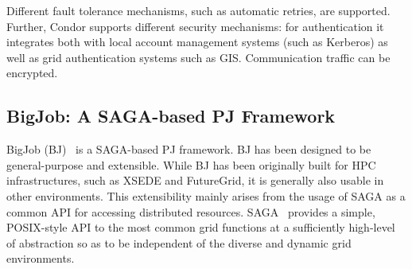 \documentclass{sig-alternate}
\begin{document}
Different fault tolerance mechanisms, such as automatic retries, are
supported.  Further, Condor supports different security mechanisms:
for authentication it integrates both with local account management
systems (such as Kerberos) as well as grid authentication systems such
as GIS. Communication traffic can be encrypted.


\subsection{BigJob: A SAGA-based PJ Framework}
\label{sec:bigjob_description}












BigJob (BJ)~\cite{bigjob_web,saga_bigjob_condor_cloud} is a SAGA-based PJ
framework. BJ has been designed to be general-purpose and extensible. While BJ
has been originally built for HPC infrastructures, such as XSEDE and FutureGrid,
it is generally also usable in other environments. This extensibility mainly
arises from the usage of SAGA as a common API for accessing distributed
resources. SAGA~\cite{saga_url,ogf-gfd-90} provides a simple, POSIX-style API to
the most common grid functions at a sufficiently high-level of abstraction so as
to be independent of the diverse and dynamic grid environments.
\end{document}
